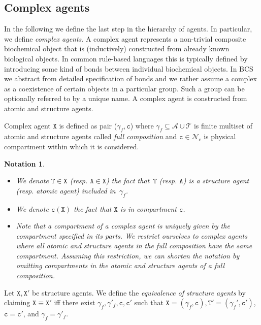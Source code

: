 \documentclass{entcs}
\renewcommand{\~}[0]{\texttildelow}
\newtheorem{notation}[thm]{Notation}
\begin{document}
\subsection{Complex agents}

In the following we define the last step in the hierarchy of agents. In particular, we define \textit{complex agents}. A complex agent represents a non-trivial composite biochemical object that is (inductively) constructed from already known biological objects. In common rule-based languages this is typically defined by introducing some kind of bonds between individual biochemical objects. In BCS we abstract from detailed specification of bonds and we rather assume a complex as a coexistence of certain objects in a particular group. Such a group can be optionally referred to by a unique name. A complex agent is constructed from atomic and structure agents.

\begin{definition}
Complex agent $\mathtt{X}$ is defined as pair ($\gamma_f, \mathtt{c}$) where $\gamma_f \subseteq \mathcal{A} \cup \mathcal{T}$ is finite multiset of atomic and structure agents called \emph{full composition} and $\mathtt{c} \in \mathcal{N}_{c}$ is physical compartment within which it is considered.
\end{definition}

\begin{notation}
~
\begin{itemize}
\item  We denote $\mathtt{T} \in \mathtt{X}$ (resp. $\mathtt{A}\in \mathtt{X}$) the fact that~$\mathtt{T}$ (resp. $\mathtt{A}$) is a structure agent (resp. atomic agent) included in~$\gamma_f$. 
\item We denote $\mathtt{c}(\mathtt{X})$ the fact that $\mathtt{X}$ is in compartment $\mathtt{c}$.
\item Note that a compartment of a complex agent is uniquely given by the compartment specified in its parts. We restrict ourselves to complex agents where all atomic and structure agents in the full composition have the same compartment. Assuming this restriction, we can shorten the notation by omitting compartments in the atomic and structure agents of a full composition. 
\end{itemize}
\end{notation}

\begin{defn}
Let $\mathtt{X},\mathtt{X}'$ be structure agents. We define the \emph{equivalence of structure agents} by claiming $\mathtt{X} \equiv \mathtt{X}'$ iff there exist $\gamma_f,\gamma'_f, \mathtt{c},\mathtt{c}'$ such that $\mathtt{X}=(\gamma_f, \mathtt{c}),\mathtt{T}'=(\gamma_f', \mathtt{c}')$, $\mathtt{c} = \mathtt{c}'$, and $\gamma_f=\gamma'_f$.
\end{defn}
\end{document}
